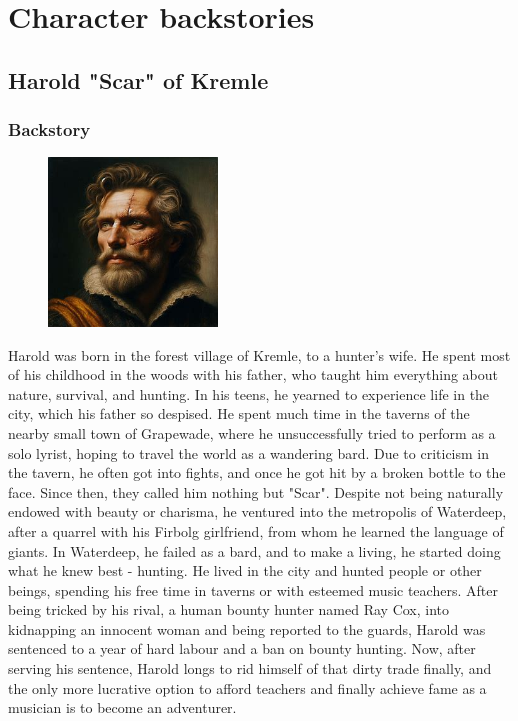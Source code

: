 \documentclass[10pt,onecolumn,twoside,openany,bg=full,layout=true]{dndbook}
\begin{document}
\vfill


\chapter{Character backstories}\label{ch:character-backstories}
\section{Harold "Scar" of Kremle}\label{sec:harold-"scar"-of-kremle}
\subsection{Backstory}\label{subsec:harold-backstory}
\begin{figure}
  \begin{center}
    \includegraphics[width=0.4\textwidth]{img/harold}
    \vspace{1cm}
  \end{center}
\end{figure}
Harold was born in the forest village of Kremle, to a hunter's wife.
He spent most of his childhood in the woods with his father, who taught him everything about nature, survival, and hunting.
In his teens, he yearned to experience life in the city, which his father so despised.
He spent much time in the taverns of the nearby small town of Grapewade,
where he unsuccessfully tried to perform as a solo lyrist, hoping to travel the world as a wandering bard.
Due to criticism in the tavern, he often got into fights, and once he got hit by a broken bottle to the face.
Since then, they called him nothing but "Scar".
Despite not being naturally endowed with beauty or charisma, he ventured into the metropolis of Waterdeep, after a
quarrel with his Firbolg girlfriend, from whom he learned the language of giants.
In Waterdeep, he failed as a bard, and to make a living, he started doing what he knew best - hunting.
He lived in the city and hunted people or other beings, spending his free time in taverns or with esteemed music teachers.
After being tricked by his rival, a human bounty hunter named Ray Cox, into kidnapping an innocent woman and
being reported to the guards, Harold was sentenced to a year of hard labour and a ban on bounty hunting.
Now, after serving his sentence, Harold longs to rid himself of that dirty trade finally, and the only more
lucrative option to afford teachers and finally achieve fame as a musician is to become an adventurer.
\end{document}
